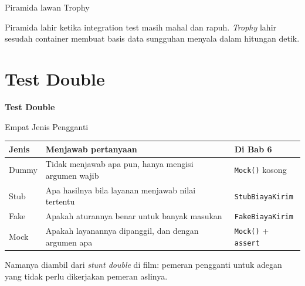 \documentclass[aspectratio=169, table, 12pt]{beamer}
\begin{document}
\begin{frame}{{\Large Piramida lawan Trophy}}
  \vspace{4pt}
  \centering

  \vspace{8pt}
  {\small Piramida lahir ketika integration test masih mahal dan rapuh.
  \textit{Trophy} lahir sesudah container membuat basis data sungguhan
  menyala dalam hitungan detik.}
\end{frame}

\section{Test Double}

\begin{frame}{\hfill}
  \centering
  \Huge{\textbf{Test Double}}
\end{frame}

\begin{frame}{{\Large Empat Jenis Pengganti}}
  \vspace{6pt}
  \centering
  {\footnotesize
  \begin{tabularx}{\textwidth}{lYl}
    \hline
    \textbf{Jenis} & \textbf{Menjawab pertanyaan} & \textbf{Di Bab 6} \\
    \hline
    Dummy & Tidak menjawab apa pun, hanya mengisi argumen wajib & \texttt{Mock()} kosong \\
    \hline
    Stub & Apa hasilnya bila layanan menjawab nilai tertentu & \texttt{StubBiayaKirim} \\
    \hline
    Fake & Apakah aturannya benar untuk banyak masukan & \texttt{FakeBiayaKirim} \\
    \hline
    Mock & Apakah layanannya dipanggil, dan dengan argumen apa & \texttt{Mock()} + \texttt{assert} \\
    \hline
  \end{tabularx}}

  \vspace{8pt}
  {\small Namanya diambil dari \textit{stunt double} di film: pemeran
  pengganti untuk adegan yang tidak perlu dikerjakan pemeran aslinya.}
\end{frame}
\end{document}
